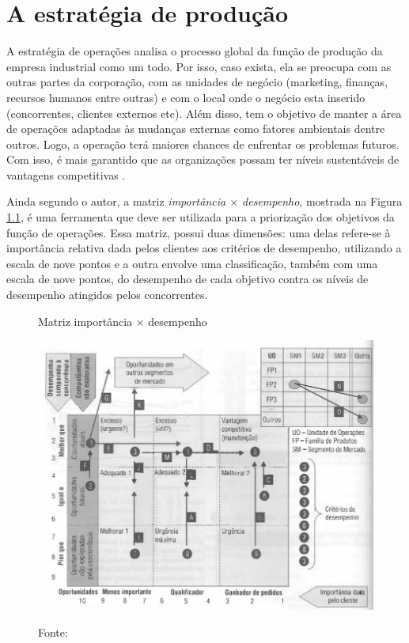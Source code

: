 \chapter{A estratégia de produção}
\label{chap:estrategia_da_producao}

A estratégia de operações analisa o processo global da função de produção da empresa industrial como um todo. Por isso, caso exista, ela se preocupa com as outras partes da corporação, com as unidades de negócio (marketing, finanças, recursos humanos entre outras) e com o local onde o negócio esta inserido (concorrentes, clientes externos etc). Além disso, tem o objetivo de manter a área de operações adaptadas às mudanças externas como fatores ambientais dentre outros. Logo, a operação terá maiores chances de enfrentar os problemas futuros. Com isso, é mais garantido que as organizações possam ter níveis sustentáveis de vantagens competitivas \cite{correa2000administracao}.

Ainda segundo o autor, a matriz \textit{importância $\times$ desempenho}, mostrada na Figura \ref{fig:matriz_importancia_desempenho}, é uma ferramenta que deve ser utilizada para a priorização dos objetivos da função de operações. Essa matriz, possui duas dimensões: uma delas refere-se à importância relativa dada pelos clientes aos critérios de desempenho, utilizando a escala de nove pontos e a outra envolve uma classificação, também com uma escala de nove pontos, do desempenho de cada objetivo contra os níveis de desempenho atingidos pelos concorrentes.

\begin{figure}[H]
  \caption{Matriz importância $\times$ desempenho}
  \includegraphics[width =1\textwidth]{images/impor_desem.png}
  \label{fig:matriz_importancia_desempenho}
  \caption*{Fonte: \cite{correa2000administracao}}
\end{figure}

